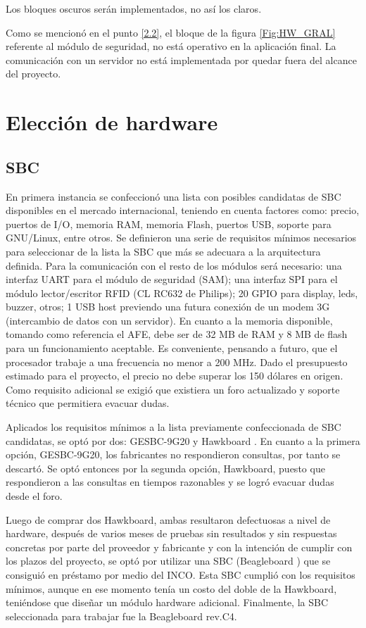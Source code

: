 Los bloques oscuros serán implementados, no así los claros.

\bigskip
Como se mencionó en el punto \ref{2.2}, el bloque de la figura \ref{Fig:HW_GRAL} referente al módulo de seguridad, no está operativo en la aplicación final. 
La comunicación con un servidor no está implementada por quedar fuera del alcance del proyecto.

\newpage
\section{Elecci\'on de hardware}

\subsection{SBC}
En primera instancia se confeccionó una lista con posibles candidatas de SBC disponibles
en el mercado internacional, teniendo en cuenta factores como: precio, puertos de I/O, memoria RAM, memoria Flash, puertos USB, soporte para GNU/Linux, entre otros.
Se definieron una serie de requisitos mínimos necesarios para seleccionar de la lista la SBC que más se adecuara a la arquitectura definida.
Para la comunicación con el resto de los módulos será necesario: una interfaz UART para el módulo de seguridad (SAM); una interfaz SPI para el módulo lector/escritor RFID (CL RC632 de Philips); 20 GPIO para display, leds, buzzer, otros; 1 USB host previendo una futura conexión de un modem 3G (intercambio de datos con un servidor). En cuanto a la memoria disponible, tomando como referencia el AFE, debe ser de 32 MB de RAM y 8 MB de flash para un funcionamiento aceptable. Es conveniente, pensando a futuro, que el procesador trabaje a una frecuencia no menor a 200 MHz.
Dado el presupuesto estimado para el proyecto, el precio no debe superar los 150 dólares en origen.
Como requisito adicional se exigió que existiera un foro actualizado y soporte técnico que permitiera evacuar dudas.


Aplicados los requisitos mínimos a la lista previamente confeccionada de SBC candidatas, se optó por dos: GESBC-9G20 \cite{9G20} y Hawkboard \cite{Hawk}.
En cuanto a la primera opción, GESBC-9G20, los fabricantes no respondieron consultas, por tanto se descartó. Se optó entonces por la segunda opción, Hawkboard, puesto que respondieron a las consultas en tiempos razonables y se logró evacuar dudas desde el foro.


Luego de comprar dos Hawkboard, ambas resultaron defectuosas a nivel de hardware, después de varios meses de pruebas sin resultados y sin respuestas concretas por parte del proveedor y fabricante y con la intención de cumplir con los plazos del proyecto, se optó por utilizar una SBC (Beagleboard \cite{Beagle}) que se consiguió en préstamo por medio del INCO. Esta SBC cumplió con los requisitos mínimos, aunque en ese momento tenía un costo del doble de la Hawkboard, teniéndose que diseñar un módulo hardware adicional.
Finalmente, la SBC seleccionada para trabajar fue la Beagleboard rev.C4.

